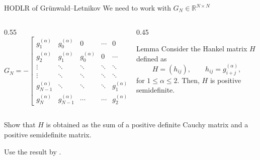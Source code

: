 \documentclass[aspectratio=169,xcolor=dvipsnames]{beamer}
\begin{document}
	\begin{frame}{HODLR of Gr\"unwald--Letnikov}
	We need to work with $G_N \in \mathbb{R}^{N \times N}$
	\begin{columns}
	\begin{column}{0.55\columnwidth}
	\begin{equation*}
		G_{N}= -\left[
		\begin{matrix}
			g_1^{(\alpha)}& g_0^{(\alpha)} & 0 & \cdots & 0 &0\\
			g_2^{(\alpha)}& g_1^{(\alpha)} & g_0^{(\alpha)}& 0 &\cdots & 0\\
			\vdots &\ddots & \ddots & \ddots &\ddots & \vdots\\
			\vdots &\ddots & \ddots & \ddots &\ddots & 0\\
			g_{N-1}^{(\alpha)}&\ddots & \ddots & \ddots & g_1^{(\alpha)}& g_0^{(\alpha)}\\
			g_{N}^{(\alpha)}& g_{N-1}^{(\alpha)} & \cdots & \cdots & g_2^{(\alpha)}& g_1^{(\alpha)}
		\end{matrix}
		\right]
	\end{equation*}
	\end{column}
	\begin{column}{0.45\columnwidth}
	\begin{alertblock}{Lemma \parencite{MR3995304}}
	Consider the Hankel matrix $H$ defined as
	\[
	H = (h_{ij}), \qquad
	h_{ij} = g_{i+j}^{(\alpha)},
	\]
	for $1 \leq \alpha \leq 2$. Then, $H$ is positive semidefinite.
	\end{alertblock}
	\end{column}
	\end{columns}
	\vfill

	\faHammer\; Show that $H$ is obtained as the sum of a positive definite Cauchy matrix and a positive semidefinite matrix.\vfill
	
	\faHammer\; Use the result by \cite{MR3947283}.

	\end{frame}
\end{document}
